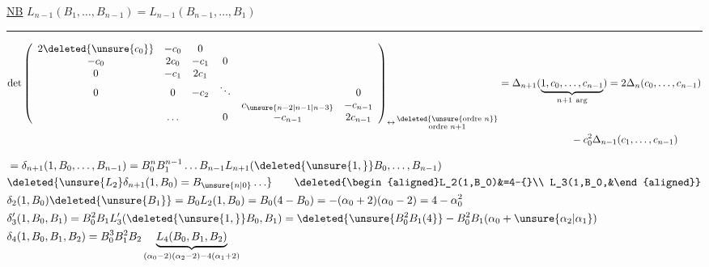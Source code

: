 \uline{NB} $L_{n-1}(B_1,\ldots,B_{n-1})=L_{n-1}(B_{n-1},\ldots,B_1)$

\begin{center}\rule{2.5cm}{0.35pt}\end{center}

\[
\begin{aligned}
\det\left(\begin{array}{cccccc}
2\deleted{\unsure{c_0}}&-c_0&0&&&\\
-c_0&2c_0&-c_1&0&&\\
0&-c_1&2c_1&&&\\
0&0&-c_2&\ddots&&0\\
&&&&c_{\unsure{n-2|n-1|n-3}}&-c_{n-1}\\
&\ldots&&0&-c_{n-1}&2c_{n-1}
\end{array}\right)_{\leftrightarrow\,\substack{\deleted{\unsure{\text{ordre }n}}\\\text{ordre }n+1}}
&=\Delta_{n+1}(\underbrace{1,c_0,\ldots,c_{n-1}}_{n+1\ \text{arg}})=2\Delta_n(c_0,\ldots,c_{n-1})\\
&\hspace{7em}-c_0^2\Delta_{n-1}(c_1,\ldots,c_{n-1})
\end{aligned}
\]

\[
\begin{aligned}
&=\delta_{n+1}(1,B_0,\ldots,B_{n-1})=B_0^n B_1^{n-1}\ldots B_{n-1}L_{n+1}(\deleted{\unsure{1,}}B_0,\ldots,B_{n-1})\\
&\deleted{\unsure{L_2}\delta_{n+1}(1,B_0)=B_{\unsure{n|0}}\ldots}
\qquad \deleted{\begin{aligned}L_2(1,B_0)&=4-{}\\ L_3(1,B_0,&\end{aligned}}\\
&\delta_2(1,B_0)\deleted{\unsure{B_1}}=B_0 L_2(1,B_0)=B_0(4-B_0)=-(\alpha_0+2)(\alpha_0-2)=4-\alpha_0^2\\
&\delta'_3(1,B_0,B_1)=B_0^2B_1L'_3(\deleted{\unsure{1,}}B_0,B_1)=\deleted{\unsure{B_0^2B_1(4}}-B_0^2B_1(\alpha_0+\unsure{\alpha_2|\alpha_1})\\
&\delta_4(1,B_0,B_1,B_2)=B_0^3B_1^2B_2\underbrace{L_4(B_0,B_1,B_2)}_{(\alpha_0-2)(\alpha_2-2)-4(\alpha_1+2)}
\end{aligned}
\]

